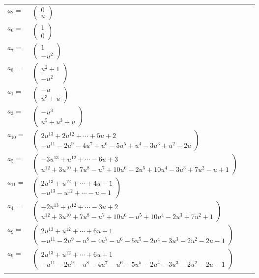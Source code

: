 \documentclass[1p]{elsarticle_modified}
\theoremstyle{definition}
\begin{document}
\begin{tabular}{m{7pt} m{180pt} m{7pt} m{180pt} }
\flushright $a_{2}=$&$\begin{pmatrix}0\\u\end{pmatrix}$ \\
\flushright $a_{6}=$&$\begin{pmatrix}1\\0\end{pmatrix}$ \\
\flushright $a_{7}=$&$\begin{pmatrix}1\\- u^2\end{pmatrix}$ \\
\flushright $a_{8}=$&$\begin{pmatrix}u^2+1\\- u^2\end{pmatrix}$ \\
\flushright $a_{1}=$&$\begin{pmatrix}- u\\u^3+u\end{pmatrix}$ \\
\flushright $a_{3}=$&$\begin{pmatrix}- u^3\\u^5+u^3+u\end{pmatrix}$ \\
\flushright $a_{10}=$&$\begin{pmatrix}2 u^{13}+2 u^{12}+\cdots+5 u+2\\- u^{11}-2 u^9-4 u^7+u^6-5 u^5+u^4-3 u^3+u^2-2 u\end{pmatrix}$ \\
\flushright $a_{5}=$&$\begin{pmatrix}-3 u^{13}+u^{12}+\cdots-6 u+3\\u^{12}+3 u^{10}+7 u^8- u^7+10 u^6-2 u^5+10 u^4-3 u^3+7 u^2- u+1\end{pmatrix}$ \\
\flushright $a_{11}=$&$\begin{pmatrix}2 u^{13}+u^{12}+\cdots+4 u-1\\- u^{13}- u^{12}+\cdots- u-1\end{pmatrix}$ \\
\flushright $a_{4}=$&$\begin{pmatrix}-2 u^{13}+u^{12}+\cdots-3 u+2\\u^{12}+3 u^{10}+7 u^8- u^7+10 u^6- u^5+10 u^4-2 u^3+7 u^2+1\end{pmatrix}$ \\
\flushright $a_{9}=$&$\begin{pmatrix}2 u^{13}+u^{12}+\cdots+6 u+1\\- u^{11}-2 u^9- u^8-4 u^7- u^6-5 u^5-2 u^4-3 u^3-2 u^2-2 u-1\end{pmatrix}$\\ \flushright $a_{9}=$&$\begin{pmatrix}2 u^{13}+u^{12}+\cdots+6 u+1\\- u^{11}-2 u^9- u^8-4 u^7- u^6-5 u^5-2 u^4-3 u^3-2 u^2-2 u-1\end{pmatrix}$\\&\end{tabular}
\end{document}
